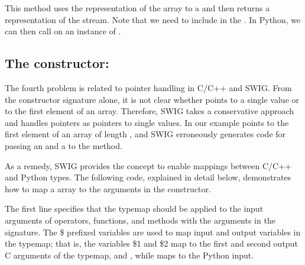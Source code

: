 \vspace*{3pt}

\noindent This method uses the  %
representation of the array to a  and then
returns a  representation of the stream.  Note that we
need to include  in the .  In Python,
we can then call  on an instance of .

\vspace*{3pt}
\subsection{The constructor: }

The fourth problem is related to pointer handling in C/C++ and SWIG. From
the constructor signature alone, it is not clear whether  points to a single value or to the first element of an array.
Therefore, SWIG takes a conservative approach and handles pointers as
pointers to single values. In our example  points to
the first element of an array of length , and SWIG erroneously
generates code for passing an  and a  to the method.

As a remedy, SWIG provides the  concept to enable mappings
between C/C++ and Python types. The following code, explained in detail
below, demonstrates how to map a \numpy array to the  arguments in the constructor.\vspace*{1.5pt}

\vspace*{3pt}

\noindent The first line specifies that the typemap should be applied to the
input  arguments of operators, functions, and methods with the
 arguments in the signature.  The \$ prefixed
variables are used to map input and output variables in the typemap;
that is, the variables \$1 and \$2 map to the first and second output C
arguments of the typemap,  and , while 
maps to the Python input.

